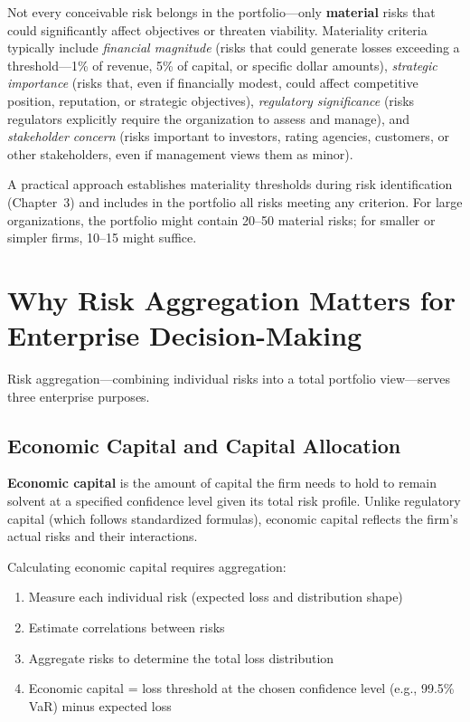 \documentclass[11pt,openany]{book}
\providecommand{\tightlist}{\setlength{\itemsep}{0pt}\setlength{\parskip}{0pt}}
\begin{document}
Not every conceivable risk belongs in the portfolio---only \textbf{material}
risks that could significantly affect objectives or threaten viability.
Materiality criteria typically include \emph{financial magnitude} (risks that
could generate losses exceeding a threshold---1\% of revenue, 5\% of capital,
or specific dollar amounts), \emph{strategic importance} (risks that, even if
financially modest, could affect competitive position, reputation, or
strategic objectives), \emph{regulatory significance} (risks regulators
explicitly require the organization to assess and manage), and
\emph{stakeholder concern} (risks important to investors, rating agencies,
customers, or other stakeholders, even if management views them as minor).

A practical approach establishes materiality thresholds during risk
identification (Chapter~3) and includes in the portfolio all risks meeting any
criterion. For large organizations, the portfolio might contain 20--50
material risks; for smaller or simpler firms, 10--15 might suffice.

\section{Why Risk Aggregation Matters for Enterprise Decision-Making}
\label{sec:why-aggregation}

Risk aggregation---combining individual risks into a total portfolio
view---serves three enterprise purposes.

\subsection{Economic Capital and Capital Allocation}
\label{subsec:economic-capital-allocation}

\textbf{Economic capital} is the amount of capital the firm needs to hold to
remain solvent at a specified confidence level given its total risk profile.
Unlike regulatory capital (which follows standardized formulas), economic
capital reflects the firm's actual risks and their interactions.

Calculating economic capital requires aggregation:

\begin{enumerate}\tightlist
  \item Measure each individual risk (expected loss and distribution shape)
  \item Estimate correlations between risks
  \item Aggregate risks to determine the total loss distribution
  \item Economic capital = loss threshold at the chosen confidence level
        (e.g., 99.5\% VaR) minus expected loss
\end{enumerate}
\end{document}
